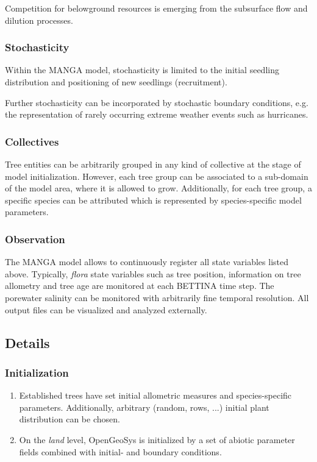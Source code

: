 Competition for belowground resources is emerging from the subsurface flow and dilution processes.
\subsubsection{Stochasticity}
Within the MANGA model, stochasticity is limited to the initial seedling distribution and positioning of new seedlings (recruitment).

Further stochasticity can be incorporated by stochastic boundary conditions, e.g. the representation of rarely occurring extreme weather events such as hurricanes.
\subsubsection{Collectives}
Tree entities can be arbitrarily grouped in any kind of collective at the stage of model initialization. 
However, each tree group can be associated to a sub-domain of the model area, where it is allowed to grow.
Additionally, for each tree group, a specific species can be attributed which is represented by species-specific model parameters.
\subsubsection{Observation}
The MANGA model allows to continuously register all state variables listed above.
Typically, \textit{flora} state variables such as tree position, information on tree allometry and tree age are monitored at each BETTINA time step.
The porewater salinity can be monitored with arbitrarily fine temporal resolution.
All output files can be visualized and analyzed externally.

\subsection*{Details}
\subsubsection{Initialization}

\begin{enumerate}
\item Established trees have set initial allometric measures and species-specific parameters.
Additionally, arbitrary (random, rows, ...) initial plant distribution can be chosen.
\item On the \textit{land} level, OpenGeoSys is initialized by a set of abiotic parameter fields combined with initial- and boundary conditions.
\end{enumerate}

